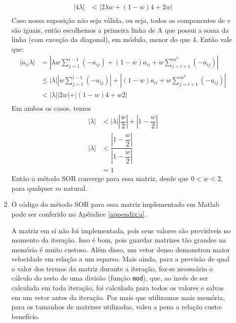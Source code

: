 \documentclass{article}
\begin{document}
\begin{enumerate}
\begin{enumerate}
\begin{align*}
                        |4 \lambda| &< \left|2\lambda w + (1-w)4 + 2w\right| \\
                    \end{align*}
                    Caso nossa suposição não seja válida, ou seja, todos os componentes de $v$ são iguais, então escolhemos a primeira linha de A
                    que possui a soma da linha (com exceção da diagonal), em módulo, menor do que 4. Então vale que:
                    \begin{align*}
                        |a_{ii} \lambda| &= \left|\lambda w \sum_{j=1}^{i-1} (-a_{ij}) + (1-w)a_{ii} + w \sum_{j=i+1}^{m^2} (-a_{ij})\right| \\
                        &\le |\lambda| \left| w \sum_{j=1}^{i-1} (-a_{ij})\right| + \left|(1-w)a_{ii} + w \sum_{j=i+1}^{m^2} (-a_{ij})\right| \\
                        &< |\lambda| \left|2 w| + |(1-w)4 + w 2\right| \\
                    \end{align*}
                    Em ambos os casos, temos
                    \begin{align*}
                        |\lambda| &< |\lambda| \left|\dfrac{w}{2}\right| + \left|1 - \dfrac{w}{2}\right| \\
                        |\lambda| &< \dfrac{\left|1 - \dfrac{w}{2}\right|}{\left|1 - \dfrac{w}{2}\right|} \\
                        &= 1
                    \end{align*}
                    Então o método SOR converge para essa matriz, desde que $0 < w < 2$, para qualquer $m$ natural.

                \item O código do método SOR para essa matriz implementado em Matlab pode ser conferido no Apêndice \ref{appendix:a}.
                
                    A matriz em si não foi implementada, pois seus valores são previsíveis no momento da iteração.
                    Isso é bom, pois guardar matrizes tão grandes na memória é muito custoso.
                    Além disso, um vetor denso demonstrou maior velocidade em relação a um esparso.
                    Mais ainda, para a previsão de qual o valor dos termos da matriz durante a iteração, fez-se necessário
                    o cálculo do resto de uma divisão (função \lstinline{mod}), que, ao invés de ser calculada em toda iteração,
                    foi calculada para todos os valores e salvas em um vetor antes da iteração. Por mais que utilizamos mais memória,
                    para os tamanhos de matrizes utilizadas, valeu a pena a relação custo-benefício.


\end{enumerate}
\end{enumerate}
\end{document}
